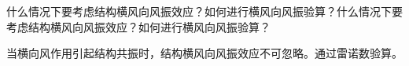 \documentclass[12pt, a4paper, oneside, UTF8]{ctexbook}
\begin{document}
\begin{example}
    什么情况下要考虑结构横风向风振效应？如何进行横风向风振验算？什么情况下要考虑结构横风向风振效应？如何进行横风向风振验算？

    当横向风作用引起结构共振时，结构横风向风振效应不可忽略。通过雷诺数验算。
\end{example}







\ifx\allfiles\undefined
\end{document}

